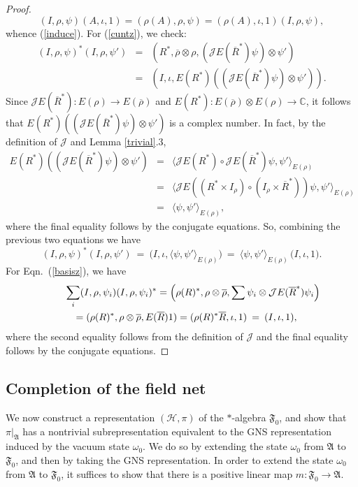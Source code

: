 \documentclass[11pt]{article}
\newcommand{\alg}[1]{\mathfrak{#1}}
\theoremstyle{definition}
\theoremstyle{definition}
\theoremstyle{remark}
\def\2#1{{\mathcal #1}}
\def\7#1{{\mathbb #1}}
\def\ol#1{{\overline #1}}
\def\om{\omega} \def\Om{\Omega} \def\dd{\partial} \def\D{\Delta}
\begin{document}
\begin{proof} 
$$   (I,\rho ,\psi )(A,\iota ,1)=(\rho (A),\rho ,\psi )=(\rho (A),\iota ,1)(I,\rho ,\psi ) ,$$ whence
(\ref{induce}).  For (\ref{cuntz}), we check:
\begin{eqnarray*} (I,\rho ,\psi )^*(I,\rho ,\psi ') &=& (R^*,\ol\rho \otimes \rho ,(\2JE(\ol R^*)\psi )\otimes \psi ') \\
  &=& (I,\iota, E(R^*)((\2JE(\ol R^*)\psi )\otimes \psi ')) .\end{eqnarray*} Since
$\2JE(\ol R^*):E(\rho )\to E(\ol \rho)$ and $E(R^*):E(\ol\rho )\otimes E(\rho )\to
\7C$, it follows that $E(R^*)((\2JE(\ol R^*)\psi )\otimes \psi ')$ is a complex
number.  In fact, by the definition of $\2J$ and Lemma \ref{trivial}.3,
\begin{eqnarray*} E(R^*)((\2JE(\ol R^*)\psi )\otimes \psi ') &=& \bigl\langle
  \2JE(R^*)\circ \2JE(\ol R^*)\psi ,\psi
  '\bigr\rangle _{E(\rho )} \\
  &=& \bigl\langle \2JE((R^*\times I_\rho )\circ (I_\rho \times \ol R^*))\psi ,\psi
  '\bigr\rangle _{E(\rho )} \\
  & =& \bigl\langle \psi ,\psi '\bigr\rangle _{E(\rho )} ,\end{eqnarray*} where the
final equality follows by the conjugate equations.  So, combining the previous two
equations we have
$$ (I,\rho ,\psi )^*(I,\rho ,\psi ') \: = \: \bigl( I,\iota ,\langle \psi ,\psi
'\rangle _{E(\rho )}) \: = \: \langle \psi ,\psi '\rangle _{E(\rho )} \,\bigl(
I,\iota ,1\bigr) .$$ For Eqn.\ (\ref{basisz}), we have
\begin{eqnarray*} \lefteqn{ \sum _i(I,\rho ,\psi _i )(I,\rho ,\psi _i)^* = \left(
      \rho (R)^*,\rho \otimes \ol\rho ,\sum
      \psi _i\otimes \2JE(\ol R^*)\psi _i \right) } \\
  &&= (\rho (R)^*,\rho\otimes \ol\rho ,E(\ol R)1 ) = (\rho (R)^*\ol R,\iota, 1) \:
  =\: (I,\iota ,1) ,\end{eqnarray*} where the second equality follows from the
definition of $\2J$ and the final equality follows by the conjugate equations.
\end{proof}



\subsection{Completion of the field net}

We now construct a representation $(\2H ,\pi )$ of the
$*$-algebra $\alg{F}_0 $, and show that $\pi
|_{\alg{A}}$ has a nontrivial subrepresentation
equivalent to the GNS representation induced by the
vacuum state $\om _0$.  We do so by extending the state
$\om _0$ from $\alg{A}$ to $\alg{F}_0 $, and then by
taking the GNS representation.  In order to extend the
state $\om _0$ from $\alg{A}$ to $\alg{F}_0 $, it
suffices to show that there is a positive linear map
$m:\alg{F}_0 \to \alg{A}$.
\end{document}
